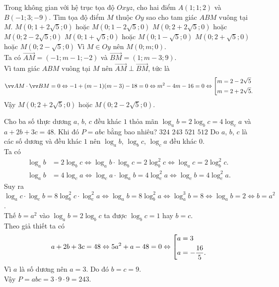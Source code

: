 \begin{ex}%
 Trong không gian với hệ trục tọa độ $Oxyz$, cho hai điểm $A(1;1;2)$ và $B(-1;3;-9)$. Tìm tọa độ điểm $M$ thuộc $Oy$ sao cho tam giác $ABM$ vuông tại $M$.
 \choice
  {$M \left( 0; 1 + 2\sqrt{5}; 0 \right)$ hoặc $M \left( 0; 1 - 2\sqrt{5}; 0 \right)$}
  {\True $M \left( 0; 2 + 2\sqrt{5}; 0 \right)$ hoặc $M \left( 0; 2 - 2\sqrt{5}; 0 \right)$}
  {$M \left( 0; 1 + \sqrt{5}; 0 \right)$ hoặc $M \left( 0; 1 - \sqrt{5}; 0 \right)$}
  {$M \left( 0; 2 + \sqrt{5}; 0 \right)$ hoặc $M \left( 0; 2 - \sqrt{5}; 0 \right)$}
 \loigiai
  {
  Vì $M \in Oy$ nên $M(0;m;0)$.\\
  Ta có $\vec{AM} = (-1;m-1;-2)$ và $\vec{BM} = (1;m-3;9)$.\\
  Vì tam giác $ABM$ vuông tại $M$ nên $\vec{AM} \perp \vec{BM}$, tức là
  $$\vec{AM} \cdot \vec{BM} = 0 \Leftrightarrow -1 + (m-1)(m-3) - 18 = 0 \Leftrightarrow m^2 - 4m - 16 = 0 \Leftrightarrow \hoac{& m = 2 - 2\sqrt{5} \\& m = 2 + 2\sqrt{5}.}$$
  Vậy $M \left( 0; 2 + 2\sqrt{5}; 0 \right)$ hoặc $M \left( 0; 2 - 2\sqrt{5}; 0 \right)$.
  }
\end{ex}

\begin{ex}%
 Cho ba số thực dương $a$, $b$, $c$ đều khác $1$ thỏa mãn $\log_a b = 2 \log_b c = 4 \log_c a$ và $a + 2b + 3c = 48$. Khi đó $P = abc$ bằng bao nhiêu?
 \choice
  {$324$}
  {\True $243$}
  {$521$}
  {$512$}
 \loigiai
  {
  Do $a$, $b$, $c$ là các số dương và đều khác $1$ nên $\log_a b$, $\log_b c$, $\log_c a$ đều khác $0$.\\
  Ta có
  \begin{align*}
   \log_a b & = 2 \log_b c \Leftrightarrow \log_a b \cdot \log_b c = 2 \log_b^2 c \Leftrightarrow \log_a c = 2 \log_b^2 c. \\
   \log_a b & = 4 \log_c a \Leftrightarrow \log_c a \cdot \log_a b = 4 \log_c^2 a \Leftrightarrow \log_c b = 4 \log_c^2 a.
  \end{align*}
  Suy ra $\log_a c \cdot \log_c b = 8 \log_b^2 c \cdot \log_c^2 a \Leftrightarrow \log_a b = 8 \log_b^2 a \Leftrightarrow \log_a^3 b = 8 \Leftrightarrow \log_a b = 2 \Leftrightarrow b = a^2$.\\
  Thế $b = a^2$ vào $\log_a b = 2 \log_b c$ ta được $\log_b c = 1$ hay $b = c$.\\
  Theo giả thiết ta có
  $$a + 2b + 3c = 48 \Leftrightarrow 5a^2 + a - 48 = 0 \Leftrightarrow \left[\begin{aligned}& a = 3 \\& a = -\dfrac{16}{5}.\end{aligned}\right.$$
  Vì $a$ là số dương nên $a = 3$. Do đó $b = c = 9$.\\
  Vậy $P = abc = 3 \cdot 9 \cdot 9 = 243$.
  }
\end{ex}


